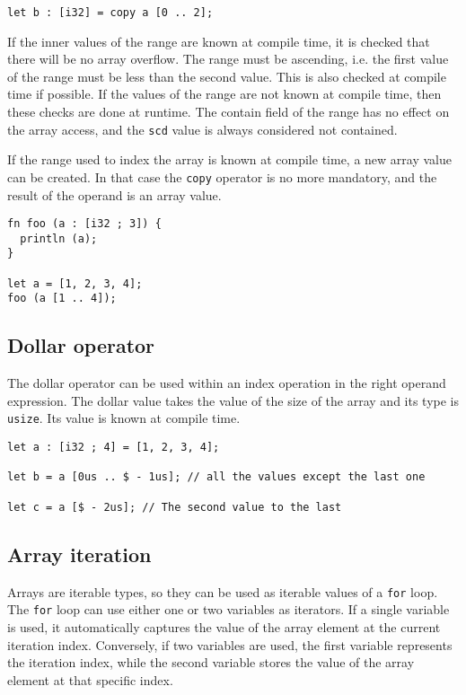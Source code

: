 \begin{itemize}
\begin{lstlisting}[style=coloredverbatim]
let b : [i32] = copy a [0 .. 2];
  \end{lstlisting}

  If the inner values of the range are known at compile time, it is checked that
  there will be no array overflow. The range must be ascending, i.e. the first
  value of the range must be less than the second value. This is also checked at
  compile time if possible. If the values of the range are not known at compile
  time, then these checks are done at runtime. The contain field of the range
  has no effect on the array access, and the \texttt{scd} value is always
  considered not contained.

  If the range used to index the array is known at compile time, a new array
  value can be created. In that case the \texttt{copy} operator is no more
  mandatory, and the result of the operand is an array value.

  \begin{lstlisting}[style=coloredverbatim]
fn foo (a : [i32 ; 3]) {
  println (a);
}

let a = [1, 2, 3, 4];
foo (a [1 .. 4]);
  \end{lstlisting}

\end{itemize}

\subsection {Dollar operator}

The dollar operator can be used within an index operation in the right operand
expression. The dollar value takes the value of the size of the array and its
type is \texttt{usize}. Its value is known at compile time.

\begin{lstlisting}[style=coloredverbatim]
let a : [i32 ; 4] = [1, 2, 3, 4];

let b = a [0us .. $ - 1us]; // all the values except the last one

let c = a [$ - 2us]; // The second value to the last
\end{lstlisting}

\subsection {Array iteration}

Arrays are iterable types, so they can be used as iterable values of a
\texttt{for} loop. The \texttt{for} loop can use either one or two variables as
iterators. If a single variable is used, it automatically captures the value of
the array element at the current iteration index. Conversely, if two variables
are used, the first variable represents the iteration index, while the second
variable stores the value of the array element at that specific index.

